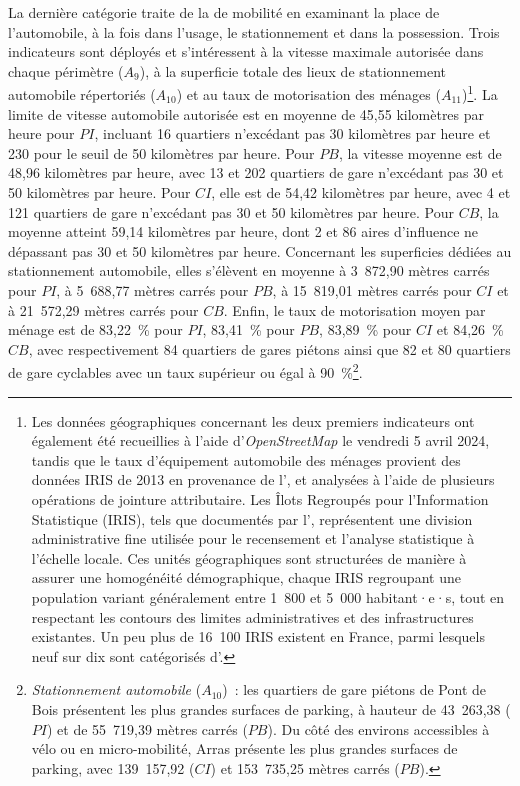 \begin{refsegment}
La dernière catégorie traite de la  de mobilité en examinant la place de l'automobile, à la fois dans l'usage, le stationnement et dans la possession. Trois indicateurs sont déployés et s'intéressent à la vitesse maximale autorisée dans chaque périmètre (\(A_{9}\)), à la superficie totale des lieux de stationnement automobile répertoriés (\(A_{10}\)) et au taux de motorisation des ménages (\(A_{11}\))\footnote{
    Les données géographiques concernant les deux premiers indicateurs ont également été recueillies à l'aide d'\textsl{OpenStreetMap} le vendredi 5 avril 2024, tandis que le taux d'équipement automobile des ménages provient des données IRIS de 2013 en provenance de l'\textcolor{blue}{\textcite{insee_documentation_2018}}, et analysées à l'aide de plusieurs opérations de jointure attributaire. Les Îlots Regroupés pour l'Information Statistique (IRIS), tels que documentés par l'\textcolor{blue}{\textcite{insee_documentation_2018}}, représentent une division administrative fine utilisée pour le recensement et l'analyse statistique à l'échelle locale. Ces unités géographiques sont structurées de manière à assurer une homogénéité démographique, chaque IRIS regroupant une population variant généralement entre 1~800 et 5~000 habitant·e·s, tout en respectant les contours des limites administratives et des infrastructures existantes. Un peu plus de 16~100 IRIS existent en France, parmi lesquels neuf sur dix sont catégorisés d'.
}. La limite de vitesse automobile autorisée est en moyenne de 45,55 kilomètres par heure pour \(PI\), incluant 16 quartiers n'excédant pas 30 kilomètres par heure et 230 pour le seuil de 50 kilomètres par heure. Pour \(PB\), la vitesse moyenne est de 48,96 kilomètres par heure, avec 13 et 202 quartiers de gare n'excédant pas 30 et 50 kilomètres par heure. Pour \(CI\), elle est de 54,42 kilomètres par heure, avec 4 et 121 quartiers de gare n'excédant pas 30 et 50 kilomètres par heure. Pour \(CB\), la moyenne atteint 59,14 kilomètres par heure, dont 2 et 86 aires d'influence ne dépassant pas 30 et 50 kilomètres par heure. Concernant les superficies dédiées au stationnement automobile, elles s'élèvent en moyenne à 3~872,90 mètres carrés pour \(PI\), à 5~688,77 mètres carrés pour \(PB\), à 15~819,01 mètres carrés pour \(CI\) et à 21~572,29 mètres carrés pour \(CB\). Enfin, le taux de motorisation moyen par ménage est de 83,22~\% pour \(PI\), 83,41~\% pour \(PB\), 83,89~\% pour \(CI\) et 84,26~\% \(CB\), avec respectivement 84 quartiers de gares piétons ainsi que 82 et 80 quartiers de gare cyclables avec un taux supérieur ou égal à 90~\%\footnote{
    \textsl{Stationnement automobile} (\(A_{10}\))~: les quartiers de gare piétons de Pont de Bois présentent les plus grandes surfaces de parking, à hauteur de 43~263,38 (\(PI\)) et de 55~719,39 mètres carrés (\(PB\)). Du côté des environs accessibles à vélo ou en micro-mobilité, Arras présente les plus grandes surfaces de parking, avec 139~157,92 (\(CI\)) et 153~735,25 mètres carrés (\(PB\)).
}.%


\end{refsegment}
